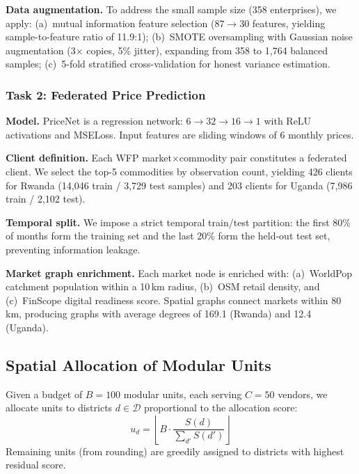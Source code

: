 \documentclass{article}
\begin{document}
\textbf{Data augmentation.}
To address the small sample size (358 enterprises), we apply:
(a)~mutual information feature selection ($87 \to 30$ features, yielding sample-to-feature ratio of 11.9:1);
(b)~SMOTE \cite{chawla2002smote} oversampling with Gaussian noise augmentation (3$\times$ copies, 5\% jitter), expanding from 358 to 1,764 balanced samples;
(c)~5-fold stratified cross-validation for honest variance estimation.

\subsubsection{Task 2: Federated Price Prediction}

\textbf{Model.}
PriceNet is a regression network: $6 \to 32 \to 16 \to 1$ with ReLU activations and MSELoss.
Input features are sliding windows of 6 monthly prices.

\textbf{Client definition.}
Each WFP market$\times$commodity pair constitutes a federated client.
We select the top-5 commodities by observation count, yielding 426 clients for Rwanda (14,046 train / 3,729 test samples) and 203 clients for Uganda (7,986 train / 2,102 test).

\textbf{Temporal split.}
We impose a strict temporal train/test partition: the first 80\% of months form the training set and the last 20\% form the held-out test set, preventing information leakage.

\textbf{Market graph enrichment.}
Each market node is enriched with: (a)~WorldPop catchment population within a 10\,km radius, (b)~OSM retail density, and (c)~FinScope digital readiness score.
Spatial graphs connect markets within 80\,km, producing graphs with average degrees of 169.1 (Rwanda) and 12.4 (Uganda).

\subsection{Spatial Allocation of Modular Units}

Given a budget of $B{=}100$ modular units, each serving $C{=}50$ vendors, we allocate units to districts $d \in \mathcal{D}$ proportional to the allocation score:
\begin{equation}
    u_d = \left\lfloor B \cdot \frac{S(d)}{\textstyle\sum_{d'} S(d')} \right\rfloor
    \label{eq:allocation}
\end{equation}
Remaining units (from rounding) are greedily assigned to districts with highest residual score.
\end{document}
